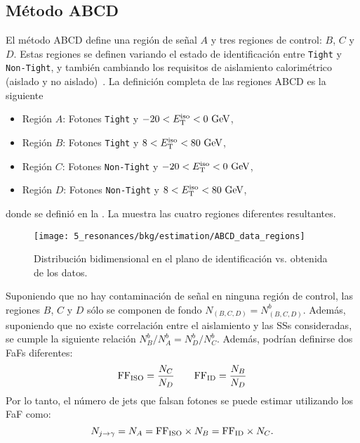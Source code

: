\subsection{Método ABCD}
\label{subsec:bkg:estimation:abcd}

El método ABCD define una región de señal \(A\) y tres regiones de control: \(B\), \(C\) y \(D\).
Estas regiones se definen variando el estado de identificación entre \texttt{Tight} y \texttt{Non-Tight}, y también cambiando los requisitos de aislamiento calorimétrico (aislado y no aislado)~\cite{ATLAS-EXOTICS-Monophoton-2017}.
La definición completa de las regiones ABCD es la siguiente
\begin{itemize}
    \item Región \(A\): Fotones \texttt{Tight} y \(-20 < E_{\text{T}}^{\text{iso}} < 0~ \text{GeV}\),
    \item Región \(B\): Fotones \texttt{Tight} y \(8 < E_{\text{T}}^{\text{iso}} < 80~ \text{GeV}\),
    \item Región \(C\): Fotones \texttt{Non-Tight} y \(-20 < E_{\text{T}}^{\text{iso}} < 0~ \text{GeV}\),
    \item Región \(D\): Fotones \texttt{Non-Tight} y \(8 < E_{\text{T}}^{\text{iso}} < 80~ \text{GeV}\),
\end{itemize}
donde \etiso se definió en la \Eqn{\ref{eq:objects:egamma:iso:definitions}}. La \Fig{\ref{fig:bkg:estimation:abcd:diagram}} muestra las cuatro regiones diferentes resultantes.

\begin{figure}[ht!]
    \centering
    \texttt{[image: 5\_resonances/bkg/estimation/ABCD\_data\_regions]}
    \caption{Distribución bidimensional en el plano de identificación vs. \etiso obtenida de los datos.}
    \label{fig:bkg:estimation:abcd:diagram}
\end{figure}

Suponiendo que no hay contaminación de señal en ninguna región de control, las regiones \(B\), \(C\) y \(D\) sólo se componen de fondo \(N_{(B,C,D)}=N^{b}_{(B,C,D)}\). Además, suponiendo que no existe correlación entre el aislamiento y las \acp{SS} consideradas, se cumple la siguiente relación \(N^{b}_{B}/N^{b}_{A}=N^{b}_{D}/N^{b}_{C}\). Además, podrían definirse dos \acp{FaF} diferentes:
\begin{equation*}
    \text{FF}_{\text{ISO}} = \frac{N_{C}}{N_{D}} \qquad \text{FF}_{\text{ID}} = \frac{N_{B}}{N_{D}}
\end{equation*}
Por lo tanto, el número de jets que falsan fotones se puede estimar utilizando los \ac{FaF} como:
\begin{equation}
    \label{eq:bkg:estimation:abcd:njfakes}
    N_{j\rightarrow\gamma} = N_{A} = \text{FF}_{\text{ISO}} \times N_{B}  = \text{FF}_{\text{ID}} \times N_{C}.
\end{equation}

